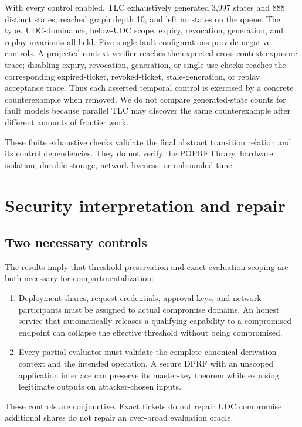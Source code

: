 \documentclass[preprint,12pt]{elsarticle}
\begin{document}
With every control enabled, TLC exhaustively generated 3,997 states and 888
distinct states, reached graph depth 10, and left no states on the queue.  The
type, UDC-dominance, below-UDC scope, expiry, revocation, generation, and
replay invariants all held.  Five single-fault configurations provide negative
controls.  A projected-context verifier reaches the expected cross-context
exposure trace; disabling expiry, revocation, generation, or single-use checks
reaches the corresponding expired-ticket, revoked-ticket, stale-generation,
or replay acceptance trace.  Thus each asserted temporal control is exercised
by a concrete counterexample when removed.  We do not compare generated-state
counts for fault models because parallel TLC may discover the same
counterexample after different amounts of frontier work.

These finite exhaustive checks validate the final abstract transition
relation and its control dependencies.  They do not verify the POPRF library,
hardware isolation, durable storage, network liveness, or unbounded time.

\section{Security interpretation and repair}

\subsection{Two necessary controls}

The results imply that threshold preservation and exact evaluation scoping are
both necessary for compartmentalization:

\begin{enumerate}[leftmargin=*]
\item Deployment shares, request credentials, approval keys, and network
  participants must be assigned to actual compromise domains.  An honest
  service that automatically releases a qualifying capability to a compromised
  endpoint can collapse the effective threshold without being compromised.
\item Every partial evaluator must validate the complete canonical derivation
  context and the intended operation.  A secure DPRF with an unscoped
  application interface can preserve its master-key theorem while exposing
  legitimate outputs on attacker-chosen inputs.
\end{enumerate}

These controls are conjunctive.  Exact tickets do not repair UDC compromise;
additional shares do not repair an over-broad evaluation oracle.
\end{document}
